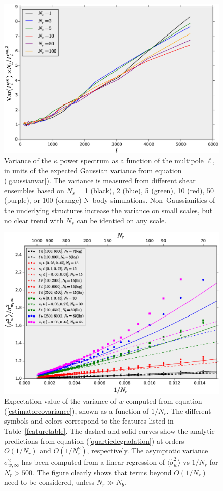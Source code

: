 \documentclass[reprint,aps,prd,superscriptaddress,showkeys,showpacs]{revtex4-1}
\newcommand{\h}[1]{\hat{#1}}
\begin{document}
\begin{figure}
\includegraphics[scale=0.3]{Figures/ps_variance.eps}
\caption{Variance of the $\kappa$ power spectrum as a function of the
  multipole $\ell$, in units of the expected Gaussian variance from
  equation (\ref{gaussianvar}). The variance is measured from
  different shear ensembles based on $N_s=$1 (black), 2 (blue), 5
  (green), 10 (red), 50 (purple), or 100 (orange) N--body simulations.
  Non--Gaussianities of the underlying structures increase the
  variance on small scales, but no clear trend with $N_s$ can be
  identied on any scale.}
\label{ps_var}
\end{figure}

\begin{figure}
\includegraphics[scale=0.3]{Figures/curving_nb.eps}
\caption{Expectation value of the variance of $w$ computed from
  equation (\ref{estimatorcovariance}), shown as a function of
  $1/N_r$. The different symbols and colors correspond to the features
  listed in Table~\ref{featuretable}.  The dashed and solid curves
  show the analytic predictions from equation
  (\ref{quarticdegradation}) at orders $O(1/N_r)$ and $O(1/N_r^2)$,
  respectively. The asymptotic variance $\sigma^2_{w,\infty}$ has been
  computed from a linear regression of $\langle\h{\sigma}^2_w\rangle$
  vs $1/N_r$ for $N_r>500$. The figure clearly shows that terms beyond
  $O(1/N_r)$ need to be considered, unless $N_r\gg N_b$.}
\label{curvingnb}
\end{figure}
\end{document}
